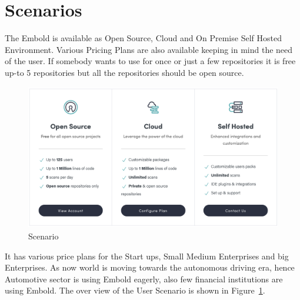 \section{Scenarios}
The Embold is available as Open Source, Cloud and On Premise Self Hosted Environment. Various Pricing Plans are also available keeping in mind the need of the user. If somebody wants to use for once or just a few repositories it is free up-to 5 repositories but  all the repositories should be open source. \par
\begin{figure}[htbp]
\begin{center}
\includegraphics[width=6.5in, height=2.5in]{scenario.png}
\caption{Scenario ~\cite{emboldio}}
\label{fig:Scenario}
\end{center}
\end{figure}
\indent It has various price plans for the Start ups, Small Medium Enterprises and big Enterprises. As now world is moving towards the autonomous driving era, hence Automotive sector is using Embold eagerly, also few financial institutions are using Embold. The over view of the User Scenario is shown in Figure~\ref{fig:Scenario}.
